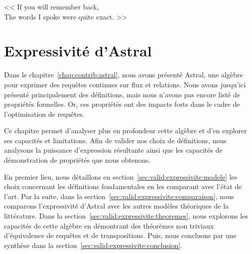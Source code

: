 \begin{savequote}[6cm]
<< If you will remember back,\\ The words I spoke were quite exact. >>
\end{savequote}

\chapter{Expressivité d'Astral}\label{chap:validation:expressivite}
\chaptertoc

Dans le chapitre~\ref{chap:contrib:astral}, nous avons présenté Astral, une algèbre pour exprimer des requêtes continues sur flux et relations. Nous avons jusqu'ici présenté principalement des définitions, mais nous n'avons pas encore listé de propriétés formelles. Or, ces propriétés ont des impacts forts dans le cadre de l'optimisation de requêtes.

Ce chapitre permet d'analyser plus en profondeur cette algèbre et d'en explorer ses capacités et limitations. Afin de valider nos choix de définitions, nous analysons la puissance d'expression résultante ainsi que les capacités de démonstration de propriétés que nous obtenons.

En premier lieu, nous détaillons en section~\ref{sec:valid:expressivite:modele} les choix concernant les définitions fondamentales en les comparant avec l'état de l'art. Par la suite, dans la section~\ref{sec:valid:expressivite:comparaison}, nous comparons l'expressivité d'Astral avec les autres modèles théoriques de la littérature. Dans la section~\ref{sec:valid:expressivite:theoremes}, nous explorons les capacités de cette algèbre en démontrant des théorèmes non triviaux d'équivalence de requêtes et de transpositions. Puis, nous concluons par une synthèse dans la section~\ref{sec:valid:expressivite:conclusion}.




